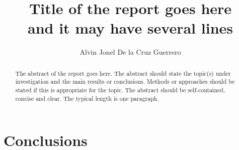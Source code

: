 \documentclass{uonmathreport}
\title{Title of the report goes here\\ and it may have several lines}
\author{Alvin Jonel De la Cruz Guerrero}
\begin{document}
\maketitle

\begin{abstract}
The abstract of the report goes here. The abstract should state the
topic(s) under investigation and the main results or
conclusions. Methods or approaches should be stated if this is
appropriate for the topic. The abstract should be self-contained,
concise and clear. The typical length is one paragraph.
\end{abstract}

\setcounter{tocdepth}{3}  %
\tableofcontents 
\newpage









\section{Conclusions} \label{sec:conclusions}

\newpage

\appendix

\newpage

\printbibliography
\end{document}
